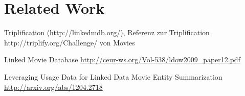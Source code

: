 \section{Related Work}
\label{sec_related_work}

Triplification (http://linkedmdb.org/), Referenz zur Triplification http://triplify.org/Challenge/ von Movies

Linked Movie Database
\url{http://ceur-ws.org/Vol-538/ldow2009_paper12.pdf}

Leveraging Usage Data for Linked Data Movie Entity Summarization 
\url{http://arxiv.org/abs/1204.2718}
